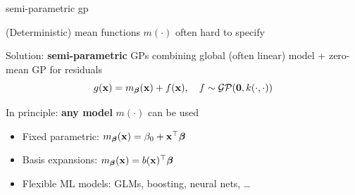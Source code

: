 \documentclass[11pt,compress,t,notes=noshow, xcolor=table]{beamer}
\begin{document}
\begin{framei}[sep=L]{semi-parametric gp}
\item (Deterministic) mean functions $m(\cdot)$ often hard to specify
\item Solution: \textbf{semi-parametric} GPs combining global (often linear) model + zero-mean GP for residuals
$$g(\mathbf{x}) = m_{\bm{\beta}}(\mathbf{x}) + f(\mathbf{x}), \quad f  \sim \mathcal{GP}(\mathbf{0}, k(\cdot, \cdot))$$

\item In principle: \textbf{any model} $m(\cdot)$ can be used
\begin{itemize}
  \item Fixed parametric: $m_{\bm{\beta}}(\mathbf{x})=\beta_0+\mathbf{x}^\top\bm{\beta}$
  \item Basis expansions: $m_{\bm{\beta}}(\mathbf{x})=b(\mathbf{x})^\top\bm{\beta}$
  \item Flexible ML models: GLMs, boosting, neural nets, \dots
\end{itemize}


\end{framei}


\end{document}
